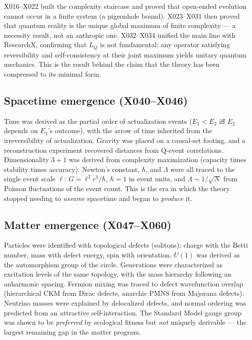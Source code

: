 \documentclass[10pt,twoside,openany]{book}
\begin{document}
X016--X022 built the complexity staircase and proved that open-ended evolution cannot occur
in a finite system (a pigeonhole bound). X023--X031 then proved that quantum reality is
the unique global maximum of finite complexity --- a necessity result, not an anthropic
one. X032--X034 unified the main line with ResearchX, confirming that $L_Q$ is not
fundamental: any operator satisfying reversibility and self-consistency at their joint
maximum yields unitary quantum mechanics. This is the result behind the claim that the
theory has been compressed to its minimal form.

\subsection{Spacetime emergence (X040--X046)}

Time was derived as the partial order of actualization events ($E_1<E_2$ iff $E_2$ depends
on $E_1$'s outcome), with the arrow of time inherited from the irreversibility of
actualization. Gravity was placed on a causal-set footing, and a reconstruction experiment
recovered distances from Q-event correlations. Dimensionality $3{+}1$ was derived from
complexity maximization (capacity times stability times accuracy). Newton's constant,
$\hbar$, and $\Lambda$ were all traced to the single event scale $\ell$: $G=\ell^2c^3/\hbar$,
$\hbar=1$ in event units, and $\Lambda\sim1/\sqrt N$ from Poisson fluctuations of the
event count. This is the era in which the theory stopped needing to \emph{assume}
spacetime and began to \emph{produce} it.

\subsection{Matter emergence (X047--X060)}

Particles were identified with topological defects (solitons): charge with the Betti
number, mass with defect energy, spin with orientation. $U(1)$ was derived as the
automorphism group of the circle. Generations were characterized as excitation levels of
the same topology, with the mass hierarchy following an anharmonic spacing. Fermion mixing
was traced to defect wavefunction overlap (hierarchical CKM from Dirac defects, anarchic
PMNS from Majorana defects). Neutrino masses were explained by delocalized defects, and
normal ordering was predicted from an attractive self-interaction. The Standard Model
gauge group was shown to be \emph{preferred} by ecological fitness but \emph{not} uniquely
derivable --- the largest remaining gap in the matter program.
\end{document}
